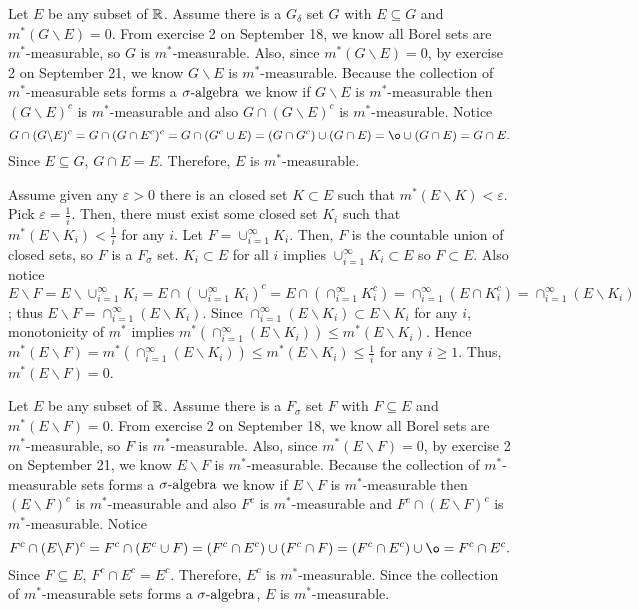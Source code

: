 \begin{enumerate}
\begin{pf}
Let $E$ be any subset of ${\mathbb R}$. Assume there is a $G_{\delta}$ set $G$ with $E \subseteq G$ and $m^*(G \backslash E)=0$. From exercise 2 on September 18, we know all Borel sets are $m^{*}$-measurable, so $G$ is $m^{*}$-measurable. Also, since $m^*(G \backslash E)=0$, by exercise 2 on September 21, we know $G \backslash E$ is $m^{*}$-measurable. Because the collection of $m^{*}$-measurable sets forms a ${\sigma}\text{-algebra}$ we know if $G \backslash E $ is $  m^{*}$-measurable then $(G \backslash E)^c$ is $  m^{*}$-measurable and also $G \cap (G \backslash E)^c$ is $m^{*}$-measurable. Notice 
\[
G \cap (G \backslash E)^c = G \cap (G \cap E^c)^c = G \cap (G^c \cup E) = (G \cap G^c) \cup (G \cap E) = \o \cup (G \cap E) = G \cap E.
\]
Since $E \subseteq G$, $G \cap E=E$. Therefore, $E$ is $m^{*}$-measurable.
\end{pf}

\begin{pf}
	Assume given any $\varepsilon>0$ there is an closed set $K \subset E$ such that $m^*(E\backslash K)<\varepsilon$. Pick $\varepsilon=\frac{1}{i}$. Then, there must exist some closed set $K_i$ such that $m^{*}(E \backslash K_i) < \frac{1}{i}$ for any $i$. Let $F = \cup_{i=1}^\infty K_i$. Then, $F$ is the countable union of closed sets, so $F$ is a $F_\sigma$ set. $K_i \subset E$ for all $i$ implies $\cup_{i=1}^\infty K_i \subset E$ so $F \subset E$. Also notice $E \backslash F = E\backslash \cup_{i=1}^\infty K_i =E \cap (\cup_{i=1}^\infty K_i)^c= E \cap (\cap_{i=1}^\infty K_i^c)= \cap_{i=1}^\infty (E \cap K_i^c) = \cap_{i=1}^\infty (E \backslash K_i) $; thus $E \backslash F = \cap_{i=1}^\infty (E \backslash K_i)$. Since $\cap_{i=1}^\infty (E \backslash K_i) \subset E \backslash K_i$ for any $i$, monotonicity of $m^{*}$ implies $m^{*}(\cap_{i=1}^\infty (E \backslash K_i)) \leq m^{*}(E \backslash K_i)$. Hence $m^{*}(E \backslash F) = m^{*}(\cap_{i=1}^\infty (E\backslash K_i))\leq  m^{*}(E \backslash K_i) \leq \frac{1}{i}$ for any $i \geq 1$. Thus,  $m^*(E \backslash F)=0$.
\end{pf}
\begin{pf}
Let $E$ be any subset of ${\mathbb R}$. Assume there is a $F_{\sigma}$ set $F$ with $F \subseteq E$ and $m^*(E \backslash F)=0$. From exercise 2 on September 18, we know all Borel sets are $m^{*}$-measurable, so $F$ is $m^{*}$-measurable. Also, since $m^*(E \backslash F)=0$, by exercise 2 on September 21, we know $E \backslash F$ is $m^{*}$-measurable. Because the collection of $m^{*}$-measurable sets forms a ${\sigma}\text{-algebra}$ we know if $E \backslash F $ is $  m^{*}$-measurable then $(E \backslash F)^c$ is $  m^{*}$-measurable and also $F^c$ is $m^{*}$-measurable and $F^c \cap (E \backslash F)^c$ is $m^{*}$-measurable. Notice 
\[
F^c \cap (E \backslash F)^c= F^c \cap (E^c \cup F) = (F^c \cap E^c) \cup (F^c \cap F)= (F^c \cap E^c) \cup \o = F^c \cap E^c .
\]
Since $F \subseteq E$, $F^c \cap E^c = E^c$. Therefore, $E^c$ is $m^{*}$-measurable. Since the collection of $m^{*}$-measurable sets forms a ${\sigma}\text{-algebra}$, $E$ is $m^{*}$-measurable. 
\end{pf}

\end{enumerate}